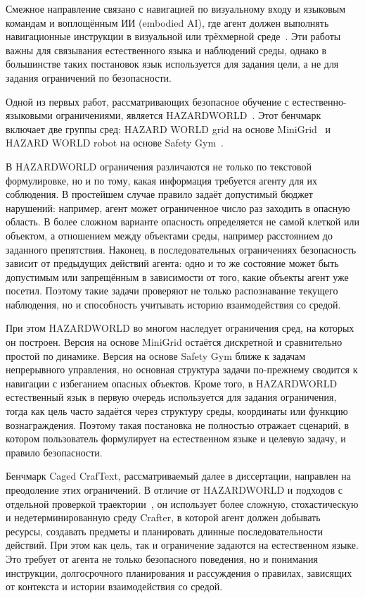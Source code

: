 Смежное направление связано с навигацией по визуальному входу и языковым командам и воплощённым ИИ (embodied AI), где агент должен выполнять навигационные инструкции в визуальной или трёхмерной среде~\cite{anderson2018vision,misra2018mapping,hermann2020directions,hao2020pretraining,chen2019touchdown,de_vries2018talk}. Эти работы важны для связывания естественного языка и наблюдений среды, однако в большинстве таких постановок язык используется для задания цели, а не для задания ограничений по безопасности.

Одной из первых работ, рассматривающих безопасное обучение с естественно-языковыми ограничениями, является HAZARDWORLD~\cite{hazardworld}. Этот бенчмарк включает две группы сред: HAZARD WORLD grid на основе MiniGrid~\cite{minigrid} и HAZARD WORLD robot на основе Safety Gym~\cite{ray2019benchmarking}.

В HAZARDWORLD ограничения различаются не только по текстовой формулировке, но и по тому, какая информация требуется агенту для их соблюдения. В простейшем случае правило задаёт допустимый бюджет нарушений: например, агент может ограниченное число раз заходить в опасную область. В более сложном варианте опасность определяется не самой клеткой или объектом, а отношением между объектами среды, например расстоянием до заданного препятствия. Наконец, в последовательных ограничениях безопасность зависит от предыдущих действий агента: одно и то же состояние может быть допустимым или запрещённым в зависимости от того, какие объекты агент уже посетил. Поэтому такие задачи проверяют не только распознавание текущего наблюдения, но и способность учитывать историю взаимодействия со средой.

При этом HAZARDWORLD во многом наследует ограничения сред, на которых он построен. Версия на основе MiniGrid остаётся дискретной и сравнительно простой по динамике. Версия на основе Safety Gym ближе к задачам непрерывного управления, но основная структура задачи по-прежнему сводится к навигации с избеганием опасных объектов. Кроме того, в HAZARDWORLD естественный язык в первую очередь используется для задания ограничения, тогда как цель часто задаётся через структуру среды, координаты или функцию вознаграждения. Поэтому такая постановка не полностью отражает сценарий, в котором пользователь формулирует на естественном языке и целевую задачу, и правило безопасности.

Бенчмарк Caged CrafText, рассматриваемый далее в диссертации, направлен на преодоление этих ограничений. В отличие от HAZARDWORLD и подходов с отдельной проверкой траектории~\cite{prakash2020guiding}, он использует более сложную, стохастическую и недетерминированную среду Crafter, в которой агент должен добывать ресурсы, создавать предметы и планировать длинные последовательности действий. При этом как цель, так и ограничение задаются на естественном языке. Это требует от агента не только безопасного поведения, но и понимания инструкции, долгосрочного планирования и рассуждения о правилах, зависящих от контекста и истории взаимодействия со средой.


